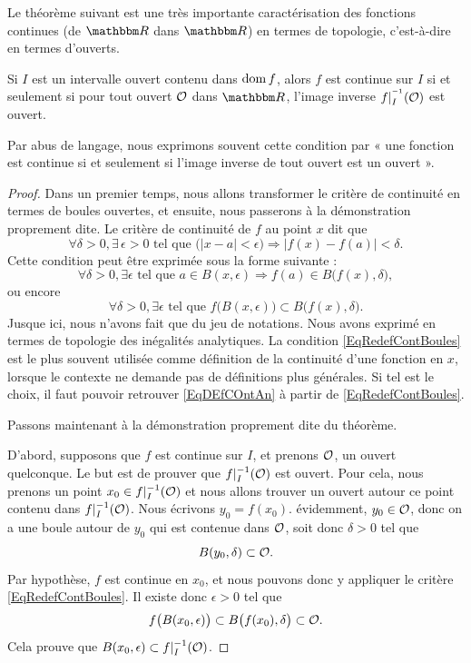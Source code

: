 Le théorème suivant est une très importante caractérisation des fonctions continues (de $\eR$ dans $\eR$) en termes de topologie, c'est-à-dire en termes d'ouverts.

\begin{theorem}     \label{ThoContInvOuvert}
Si $I$ est un intervalle ouvert contenu dans $\operatorname{dom} f$, alors $f$ est continue sur $I$ si et seulement si pour tout ouvert $\mathcal{O}$ dans $\eR$, l'image inverse $f|_I^{^{-1}}(\mathcal{O})$ est ouvert.
\end{theorem}

Par abus de langage, nous exprimons souvent cette condition par « une fonction est continue si et seulement si l'image inverse de tout ouvert est un ouvert ».

\begin{proof}

Dans un premier temps, nous allons transformer le critère de continuité en termes de boules ouvertes, et ensuite, nous passerons à la démonstration proprement dite. Le critère de continuité de $f$ au point $x$ dit que
\begin{equation}        \label{EqDEfCOntAn}
  \forall \delta>0,\exists\,\epsilon>0\text{ tel que }\big( | x-a |< \epsilon \big)\Rightarrow| f(x)-f(a) |<\delta.
\end{equation}
Cette condition peut être exprimée sous la forme suivante :
\[
  \forall \delta>0,\exists\epsilon\text{ tel que } a\in B(x,\epsilon)\Rightarrow f(a)\in B\big( f(x),\delta \big),
\]
ou encore
\begin{equation}        \label{EqRedefContBoules}
  \forall \delta>0,\exists\epsilon\text{ tel que } f\big( B(x,\epsilon) \big)\subset B\big( f(x),\delta \big).
\end{equation}
Jusque ici, nous n'avons fait que du jeu de notations. Nous avons exprimé en termes de topologie des inégalités analytiques. La condition \eqref{EqRedefContBoules} est le plus souvent utilisée comme définition de la continuité d'une fonction en \( x\), lorsque le contexte ne demande pas de définitions plus générales. Si tel est le choix, il faut pouvoir retrouver \eqref{EqDEfCOntAn} à partir de \eqref{EqRedefContBoules}.

Passons maintenant à la démonstration proprement dite du théorème.

D'abord, supposons que $f$ est continue sur $I$, et prenons $\mathcal{O}$, un ouvert quelconque. Le but est de prouver que $f|_I^{-1}(\mathcal{O})$ est ouvert. Pour cela, nous prenons un point $x_0\in f|_I^{-1}(\mathcal{O})$ et nous allons trouver un ouvert autour ce point contenu dans $f|_I^{-1}(\mathcal{O})$. Nous écrivons $y_0=f(x_0)$. évidemment, $y_0\in\mathcal{O}$, donc on a une boule autour de $y_0$ qui est contenue dans $\mathcal{O}$, soit donc $\delta>0$ tel que
\[
  B(y_0,\delta)\subset\mathcal{O}.
\]
Par hypothèse, $f$ est continue en $x_0$, et nous pouvons donc y appliquer le critère \eqref{EqRedefContBoules}. Il existe donc $\epsilon>0$ tel que
\[
  f\big( B(x_0,\epsilon) \big)\subset B\big( f(x_0),\delta \big)\subset\mathcal{O}.
\]
Cela prouve que $B(x_0,\epsilon)\subset f|_I^{-1}(\mathcal{O})$.


\end{proof}
